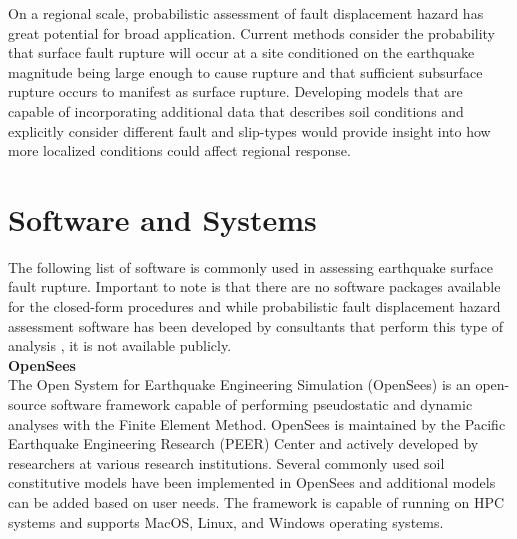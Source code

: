 On a regional scale, probabilistic assessment of fault displacement hazard has great potential for broad application. Current methods consider the probability that surface fault rupture will occur at a site conditioned on the earthquake magnitude being large enough to cause rupture and that sufficient subsurface rupture occurs to manifest as surface rupture. Developing models that are capable of incorporating additional data that describes soil conditions and explicitly consider different fault and slip-types would provide insight into how more localized conditions could affect regional response.


\section{Software and Systems}
\label{sec:eq_surface_rup_tools}

The following list of software is commonly used in assessing earthquake surface fault rupture. Important to note is that there are no software packages available for the closed-form procedures and while probabilistic fault displacement hazard assessment software has been developed by consultants that perform this type of analysis \citep{wells2014probabilistic}, it is not available publicly.\\

\noindent\textbf{OpenSees}\\
The Open System for Earthquake Engineering Simulation (OpenSees) is an open-source software framework capable of performing pseudostatic and dynamic analyses with the Finite Element Method. OpenSees is maintained by the Pacific Earthquake Engineering Research (PEER) Center and actively developed by researchers at various research institutions. Several commonly used soil constitutive models have been implemented in OpenSees and additional models can be added based on user needs. The framework is capable of running on HPC systems and supports MacOS, Linux, and Windows operating systems.\\

